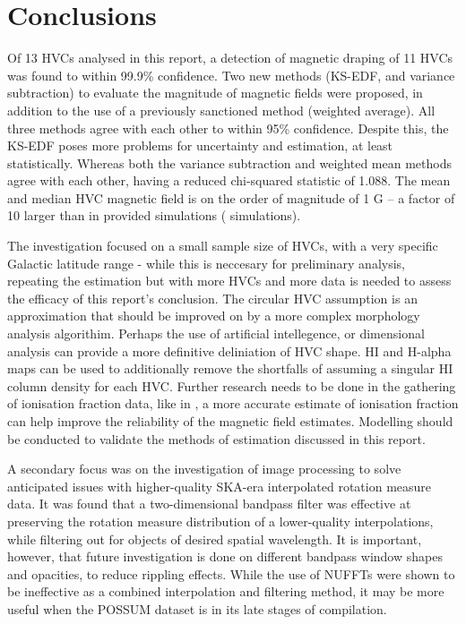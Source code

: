 \chapter{Conclusions}
\label{cha:conclusion}

Of 13 HVCs analysed in this report, a detection of magnetic draping of 11 HVCs was found to within 99.9\% confidence. Two new methods (KS-EDF, and variance subtraction) to evaluate the magnitude of magnetic fields were proposed, in addition to the use of a previously sanctioned method (weighted average). All three methods agree with each other to within 95\% confidence. Despite this, the KS-EDF poses more problems for uncertainty and estimation, at least statistically. Whereas both the variance subtraction and weighted mean methods agree with each other, having a reduced chi-squared statistic of 1.088. The mean and median HVC magnetic field is on the order of magnitude of 1 \textmu G – a factor of 10 larger than in provided simulations (\citeauthor{ID23} simulations).


The investigation focused on a small sample size of HVCs, with a very specific Galactic latitude range - while this is neccesary for preliminary analysis, repeating the estimation but with more HVCs and more data is needed to assess the efficacy of this report's conclusion. The circular HVC assumption is an approximation that should be improved on by a more complex morphology analysis algorithim. Perhaps the use of artificial intellegence, or dimensional analysis can provide a more definitive deliniation of HVC shape. HI and H-alpha maps can be used to additionally remove the shortfalls of assuming a singular HI column density for each HVC. Further research needs to be done in the gathering of ionisation fraction data, like in \cite{ID67}, a more accurate estimate of ionisation fraction can help improve the reliability of the magnetic field estimates. Modelling should be conducted to validate the methods of estimation discussed in this report.


A secondary focus was on the investigation of image processing to solve anticipated issues with higher-quality SKA-era interpolated rotation measure data. It was found that a two-dimensional bandpass filter was effective at preserving the rotation measure distribution of a lower-quality interpolations, while filtering out for objects of desired spatial wavelength. It is important, however, that future investigation is done on different bandpass window shapes and opacities, to reduce rippling effects. While the use of NUFFTs were shown to be ineffective as a combined interpolation and filtering method, it may be more useful when the POSSUM dataset is in its late stages of compilation.
